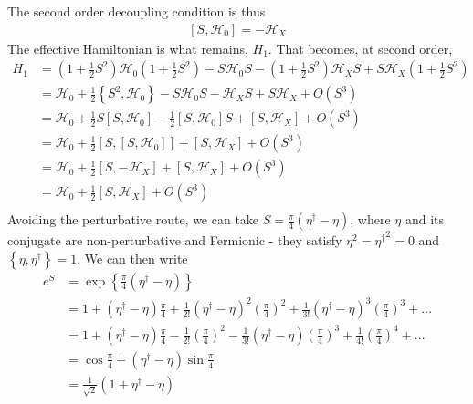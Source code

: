 \documentclass[twoside]{report}
\numberwithin{equation}{section}
\begin{document}
The second order decoupling condition is thus
\begin{equation}\begin{aligned}
	\label{dec_cond}
	\left[S,\mathcal{H}_0\right] = -\mathcal{H}_X
\end{aligned}\end{equation}
The effective Hamiltonian is what remains, \(H_1\). That becomes, at second order,
\begin{equation}\begin{aligned}
	H_1 &= \left(1 + \frac{1}{2} S^2\right) \mathcal{H}_0 \left(1 + \frac{1}{2} S^2\right) - S \mathcal{H}_0 S -\left(1 + \frac{1}{2} S^2\right) \mathcal{H}_X S + S \mathcal{H}_X \left(1 + \frac{1}{2} S^2\right)\\
    &= \mathcal{H}_0 + \frac{1}{2} \left\{S^2, \mathcal{H}_0\right\} - S \mathcal{H}_0 S - \mathcal{H}_X S + S \mathcal{H}_X + O(S^3)\\
    &= \mathcal{H}_0 + \frac{1}{2} S\left[S, \mathcal{H}_0\right] - \frac{1}{2} \left[S, \mathcal{H}_0\right]S  + \left[S,\mathcal{H}_X\right] + O(S^3)\\
    &= \mathcal{H}_0 + \frac{1}{2} \left[S,\left[S, \mathcal{H}_0\right]\right] + \left[S,\mathcal{H}_X\right] + O(S^3)\\
    &= \mathcal{H}_0 + \frac{1}{2} \left[S,-\mathcal{H}_X\right] + \left[S,\mathcal{H}_X\right] + O(S^3)\\
    &= \mathcal{H}_0 + \frac{1}{2}\left[S,\mathcal{H}_X\right] + O(S^3)\\
\end{aligned}\end{equation}
Avoiding the perturbative route, we can take \(S = \frac{\pi}{4}\left(\eta^\dagger - \eta\right)\), where \(\eta\) and its conjugate are non-perturbative and Fermionic - they satisfy \(\eta^2 = {\eta^\dagger}^2 = 0\) and \(\left\{\eta,\eta^\dagger\right\}=1\). We can then write
\begin{equation}\begin{aligned}
	e^S &= \exp\left\{\frac{\pi}{4}\left(\eta^\dagger - \eta\right)\right\} \\
	    &= 1 + \left(\eta^\dagger - \eta\right)\frac{\pi}{4} + \frac{1}{2!}\left(\eta^\dagger - \eta\right)^2\left(\frac{\pi}{4}\right)^2 + \frac{1}{3!}\left(\eta^\dagger - \eta\right)^3\left(\frac{\pi}{4}\right)^3 + ...\\
	    &= 1 + \left(\eta^\dagger - \eta\right)\frac{\pi}{4} - \frac{1}{2!}\left(\frac{\pi}{4}\right)^2 - \frac{1}{3!}\left(\eta^\dagger - \eta\right)\left(\frac{\pi}{4}\right)^3 + \frac{1}{4!}\left(\frac{\pi}{4}\right)^4 + ...\\
	    &= \cos \frac{\pi}{4} + \left(\eta^\dagger - \eta\right)\sin\frac{\pi}{4}\\
	    &= \frac{1}{\sqrt 2}\left(1 + \eta^\dagger - \eta\right)
\end{aligned}\end{equation}
\end{document}
